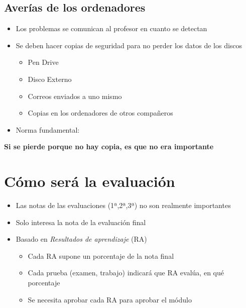 \documentclass[a4paper]{article}
\begin{document}
\subsection{Averías de los ordenadores}
\label{sec:org0000009}
\begin{itemize}
\item Los problemas se comunican al profesor en cuanto se detectan
\item Se deben hacer copias de seguridad para no perder los datos de los discos
\begin{itemize}
\item Pen Drive
\item Disco Externo
\item Correos enviados a uno mismo
\item Copias en los ordenadores de otros compañeros
\end{itemize}
\item Norma fundamental:
\end{itemize}
\textbf{Si se pierde porque no hay copia, es que no era importante}
\section{Cómo será la evaluación}
\label{sec:org000000f}
\begin{itemize}
\item Las notas de las evaluaciones (1ª,2ª,3ª) no son realmente importantes
\item Solo interesa la nota de la evaluación final
\item Basado en \emph{Resultados de aprendizaje} (RA)
\begin{itemize}
\item Cada RA supone un porcentaje de la nota final
\item Cada prueba (examen, trabajo) indicará que RA evalúa, en qué porcentaje
\item Se necesita aprobar cada RA para aprobar el módulo
\end{itemize}
\end{itemize}
\end{document}
